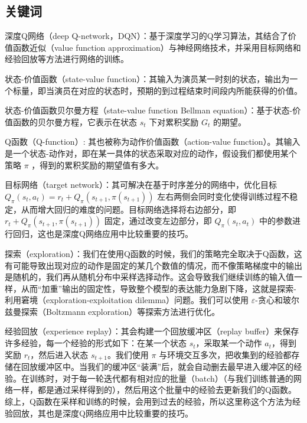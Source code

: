 \subsection{关键词}

深度Q网络（deep Q-network，DQN）：基于深度学习的Q学习算法，其结合了价值函数近似（value function approximation）与神经网络技术，并采用目标网络和经验回放等方法进行网络的训练。

状态-价值函数（state-value function）：其输入为演员某一时刻的状态，输出为一个标量，即当演员在对应的状态时，预期的到过程结束时间段内所能获得的价值。

状态-价值函数贝尔曼方程（state-value function Bellman equation）：基于状态-价值函数的贝尔曼方程，它表示在状态 $s_t$ 下对累积奖励 $G_t$ 的期望。

Q函数（Q-function）: 其也被称为动作价值函数（action-value function）。其输入是一个状态-动作对，即在某一具体的状态采取对应的动作，假设我们都使用某个策略 $\pi$ ，得到的累积奖励的期望值有多大。

目标网络（target network）：其可解决在基于时序差分的网络中，优化目标 $Q_{\pi}\left(s_{t}, a_{t}\right) = r_{t}+Q_{\pi}\left(s_{t+1}, \pi\left(s_{t+1}\right)\right)$ 左右两侧会同时变化使得训练过程不稳定，从而增大回归的难度的问题。目标网络选择将右边部分，即 $r_{t}+Q_{\pi}\left(s_{t+1}, \pi\left(s_{t+1}\right)\right)$ 固定，通过改变左边部分，即 $Q_{\pi}\left(s_{t}, a_{t}\right)$ 中的参数进行回归，这也是深度Q网络应用中比较重要的技巧。

探索（exploration）：我们在使用Q函数的时候，我们的策略完全取决于Q函数，这有可能导致出现对应的动作是固定的某几个数值的情况，而不像策略梯度中的输出是随机的，我们再从随机分布中采样选择动作。这会导致我们继续训练的输入值一样，从而“加重”输出的固定性，导致整个模型的表达能力急剧下降，这就是探索-利用窘境（exploration-exploitation dilemma）问题。我们可以使用 $\varepsilon$-贪心和玻尔兹曼探索（Boltzmann exploration）等探索方法进行优化。

经验回放（experience replay）：其会构建一个回放缓冲区（replay buffer）来保存许多经验，每一个经验的形式如下：在某一个状态 $s_t$，采取某一个动作 $a_t$，得到奖励 $r_t$，然后进入状态 $s_{t+1}$。我们使用 $\pi$ 与环境交互多次，把收集到的经验都存储在回放缓冲区中。当我们的缓冲区“装满”后，就会自动删去最早进入缓冲区的经验。在训练时，对于每一轮迭代都有相对应的批量（batch）（与我们训练普通的网络一样，都是通过采样得到的），然后用这个批量中的经验去更新我们的Q函数。综上，Q函数在采样和训练的时候，会用到过去的经验，所以这里称这个方法为经验回放，其也是深度Q网络应用中比较重要的技巧。


